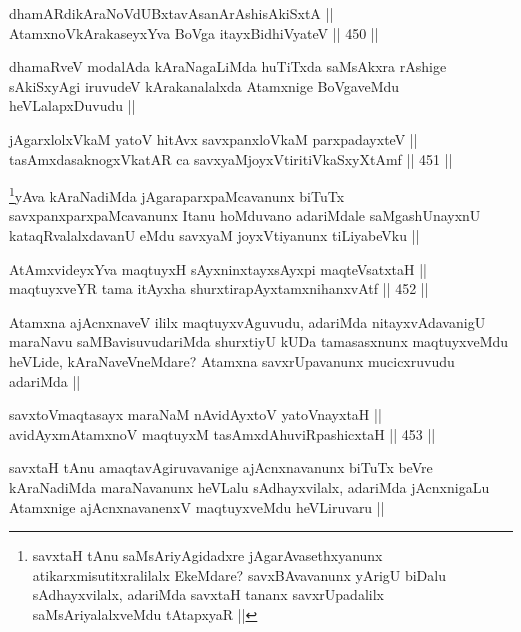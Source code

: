 \begin{shl}
dhamARdikAraNoVdUBxtavAsanArAshisAkiSxtA || \\
AtamxnoV\s kArakaseyxYva BoVga itayxBidhiVyateV ||  450 ||  
\end{shl}

\begin{artha}
dhamaRveV modalAda kAraNagaLiMda huTiTxda saMsAkxra rAshige sAkiSxyAgi iruvudeV kArakanalalxda Atamxnige BoVgaveMdu heVLalapxDuvudu ||
\end{artha}

\begin{shl}
jAgarxlolxVkaM yatoV hitAvx savxpanxloVkaM parxpadayxteV ||  \\
tasAmxdasaknogxV\s katAR ca savxyaMjoyxVtiritiVkaSxyXtAmf ||  451 ||  
\end{shl}

\begin{artha}
\footnote{savxtaH tAnu saMsAriyAgidadxre jAgarAvasethxyanunx atikarxmisutitxralilalx EkeMdare? savxBAvavanunx yArigU biDalu sAdhayxvilalx, adariMda savxtaH tananx savxrUpadalilx saMsAriyalalxveMdu tAtapxyaR ||}yAva kAraNadiMda jAgaraparxpaMcavanunx biTuTx savxpanxparxpaMcavanunx Itanu hoMduvano adariMdale saMgashUnayxnU kataqRvalalxdavanU eMdu savxyaM joyxVtiyanunx tiLiyabeVku ||
\end{artha}


\begin{shl}
AtAmxvideyxYva maqtuyxH sAyxninxtayxsAyxpi maqteVsatxtaH || \\
maqtuyxveYR tama itAyxha shurxtirapAyxtamxnihanxvAtf ||  452 || 
\end{shl}

\begin{artha}
Atamxna ajAcnxnaveV ililx maqtuyxvAguvudu, adariMda nitayxvAdavanigU maraNavu saMBavisuvudariMda shurxtiyU kUDa tamasasxnunx maqtuyxveMdu heVLide, kAraNaveVneMdare? Atamxna savxrUpavanunx mucicxruvudu adariMda ||
\end{artha}

\begin{shl}
savxtoVmaqtasayx maraNaM nAvidAyxtoV yatoV\s nayxtaH || \\
avidAyxmAtamxnoV maqtuyxM tasAmxdAhuviRpashicxtaH ||  453 ||  
\end{shl}

\begin{artha}
savxtaH tAnu amaqtavAgiruvavanige ajAcnxnavanunx biTuTx beVre kAraNadiMda maraNavanunx heVLalu sAdhayxvilalx, adariMda jAcnxnigaLu Atamxnige ajAcnxnavanenxV maqtuyxveMdu heVLiruvaru ||
\end{artha}

